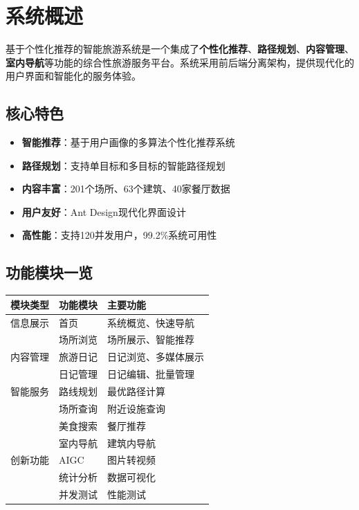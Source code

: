 \documentclass[12pt, a4paper]{article}
\begin{document}
\tableofcontents
\newpage

\section{系统概述}

\begin{infobox}[title={系统介绍}]
基于个性化推荐的智能旅游系统是一个集成了\textbf{个性化推荐}、\textbf{路径规划}、\textbf{内容管理}、\textbf{室内导航}等功能的综合性旅游服务平台。系统采用前后端分离架构，提供现代化的用户界面和智能化的服务体验。
\end{infobox}

\subsection{核心特色}

\begin{itemize}
    \item \textbf{智能推荐}：基于用户画像的多算法个性化推荐系统
    \item \textbf{路径规划}：支持单目标和多目标的智能路径规划
    \item \textbf{内容丰富}：201个场所、63个建筑、40家餐厅数据
    \item \textbf{用户友好}：Ant Design现代化界面设计
    \item \textbf{高性能}：支持120并发用户，99.2\%系统可用性
\end{itemize}

\subsection{功能模块一览}

\begin{table}[H]
\centering
\begin{tabular}{lll}
\toprule
\rowcolor{primary!20}
\textbf{模块类型} & \textbf{功能模块} & \textbf{主要功能} \\
\midrule
信息展示 & 首页 & 系统概览、快速导航 \\
\rowcolor{light}
 & 场所浏览 & 场所展示、智能推荐 \\
\midrule
内容管理 & 旅游日记 & 日记浏览、多媒体展示 \\
\rowcolor{light}
 & 日记管理 & 日记编辑、批量管理 \\
\midrule
智能服务 & 路线规划 & 最优路径计算 \\
\rowcolor{light}
 & 场所查询 & 附近设施查询 \\
 & 美食搜索 & 餐厅推荐 \\
\rowcolor{light}
 & 室内导航 & 建筑内导航 \\
\midrule
创新功能 & AIGC & 图片转视频 \\
\rowcolor{light}
 & 统计分析 & 数据可视化 \\
 & 并发测试 & 性能测试 \\
\bottomrule
\end{tabular}
\end{table}
\end{document}
